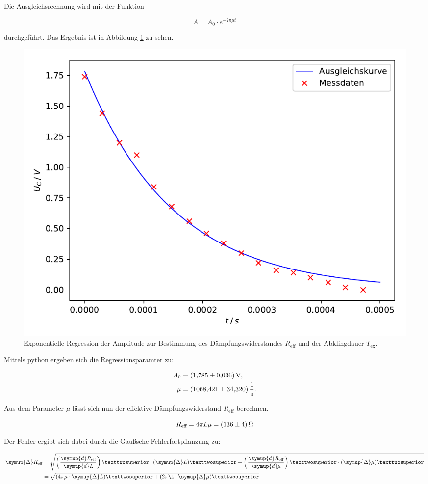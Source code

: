 Die Ausgleichsrechnung wird mit der Funktion 

\begin{equation*}
A = A_0 \cdot e^{-2\pi\mu t}
\end{equation*}

durchgeführt. Das Ergebnis ist in Abbildung \ref{fig:gedämpft} zu sehen. 

\begin{figure}
  \centering
  \includegraphics[scale=0.8]{content/plot1.pdf}
  \caption{Exponentielle Regression der Amplitude zur Bestimmung des Dämpfungswiderstandes $R_\text{eff}$ und 
der Abklingdauer $T_\text{ex}$.}
  \label{fig:gedämpft}
\end{figure}

Mittels python ergeben sich die Regressionsparamter zu: 

\begin{align*}
A_0 &= \SI{1.785+-0.036}{\volt},\\
\mu &= \SI{1068.421+-34.320}{\per\second}.
\end{align*}

Aus dem Parameter $\mu$ lässt sich nun der effektive Dämpfungswiderstand
$R_\text{eff}$ berechnen.

\begin{equation*}
R_\text{eff} = 4\pi L\mu = \SI{136+-4}{\ohm}
\end{equation*}

Der Fehler ergibt sich dabei durch die Gaußsche Fehlerfortpflanzung zu: 

\begin{align*}
\symup{\Delta} R_\text{eff} &= \sqrt{\left(\frac{\symup{d}R_\text{eff}}{\symup{d}L}\right)²\cdot (\symup{\Delta}L)² +
\left(\frac{\symup{d}R_\text{eff}}{\symup{d}\mu}\right)²\cdot (\symup{\Delta}\mu)²}\\
&=\sqrt{(4\pi\mu\cdot \symup{\Delta}L)²+(2\pi\L\cdot \symup{\Delta}\mu)²} 
\end{align*}

